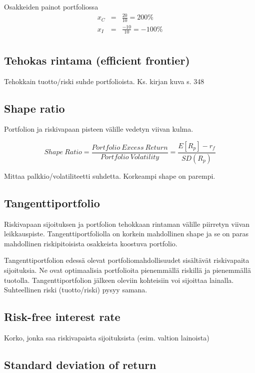 \documentclass[a4paper]{article}
\begin{document}
Osakkeiden painot portfoliossa
\[
\begin{array}{lcl}
    x_C & = & \frac{20}{10} = 200\% \\
    x_I & = & \frac{-10}{10} = -100\% \\
\end{array}
\]

\subsection{Tehokas rintama (efficient frontier)}

Tehokkain tuotto/riski suhde portfolioista. Ks. kirjan kuva s. 348

\subsection{Shape ratio}

Portfolion ja riskivapaan pisteen välille vedetyn viivan kulma.

\[
    Shape\ Ratio = \frac{Portfolio\ Excess\ Return}{Portfolio\ Volatility} = \frac{E[R_p] - r_f}{SD(R_p)}
\]

Mittaa palkkio/volatiliteetti suhdetta. Korkeampi shape on parempi.

\subsection{Tangenttiportfolio}

Riskivapaan sijoituksen ja portfolion tehokkaan rintaman välille piirretyn viivan leikkauspiste. Tangenttiportfoliolla on korkein mahdollinen shape ja se on paras mahdollinen riskipitoisista osakkeista koostuva portfolio.

Tangenttiportfolion edessä olevat portfoliomahdollisuudet sisältävät riskivapaita sijoituksia. Ne ovat optimaalisia portfolioita pienemmällä riskillä ja pienemmällä tuotolla. Tangenttiportfolion jälkeen oleviin kohteisiin voi sijoittaa lainalla. Suhteellinen riski (tuotto/riski) pysyy samana.

\subsection{Risk-free interest rate}

Korko, jonka saa riskivapaista sijoituksista (esim. valtion lainoista)

\subsection{Standard deviation of return}
\end{document}
